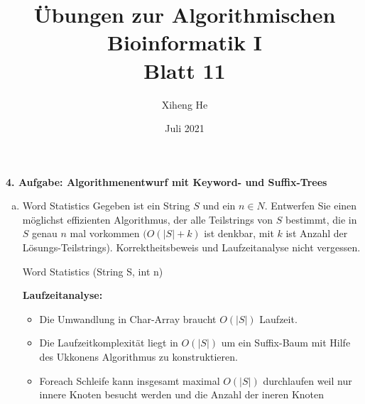 \documentclass{article}
\title{Übungen zur Algorithmischen Bioinformatik I\\
Blatt 11}
\author{Xiheng He}
\date{Juli 2021}
\begin{document}
\maketitle
\begin{flushleft}
\textbf{4. Aufgabe: Algorithmenentwurf mit Keyword- und Suffix-Trees}
\begin{enumerate}[(a)]
    \item Word Statistics
    \newline
    Gegeben ist ein String $S$ und ein $n \in N$. Entwerfen Sie einen möglichst effizienten Algorithmus,
    der alle Teilstrings von $S$ bestimmt, die in $S$ genau $n$ mal vorkommen $(O(|S| + k)$ ist
    denkbar, mit $k$ ist Anzahl der Lösungs-Teilstrings). Korrektheitsbeweis und Laufzeitanalyse
    nicht vergessen.
    \newline
    \begin{algorithm}
        \NoCaptionOfAlgo
        \SetSideCommentLeft
        \caption{Word Statistics (String S, int n)}
    \end{algorithm}
    \newline
    \textbf{Laufzeitanalyse: }
    \begin{itemize}
        \item Die Umwandlung in Char-Array braucht $O(|S|)$ Laufzeit.
        \item Die Laufzeitkomplexität liegt in $O(|S|)$ um ein Suffix-Baum mit Hilfe des Ukkonens Algorithmus zu konstruktieren.
        \item Foreach Schleife kann insgesamt maximal $O(|S|)$ durchlaufen weil nur innere Knoten besucht werden und die Anzahl der ineren Knoten

\end{itemize}
\end{enumerate}
\end{flushleft}
\end{document}

